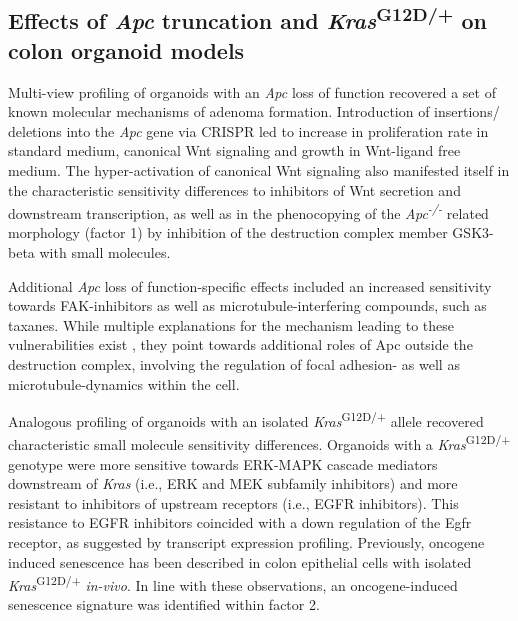 \begin{flushleft}
\clearpage
\subsection{Effects of \textit{Apc} truncation and \textit{Kras}\textsuperscript{G12D/+} on colon organoid models}

Multi-view profiling of organoids with an \textit{Apc} loss of function recovered a set of known molecular mechanisms of adenoma formation. Introduction of insertions/ deletions into the \textit{Apc} gene via CRISPR led to increase in proliferation rate in standard medium, canonical Wnt signaling and growth in Wnt-ligand free medium. The hyper-activation of canonical Wnt signaling also manifested itself in the characteristic sensitivity differences to inhibitors of Wnt secretion and downstream transcription, as well as in the phenocopying of the \textit{Apc\textsuperscript{-/-}} related morphology (factor 1) by inhibition of the destruction complex member GSK3-beta with small molecules.
\smallbreak

Additional \textit{Apc} loss of function-specific effects included an increased sensitivity towards FAK-inhibitors as well as microtubule-interfering compounds, such as taxanes. While multiple explanations for the mechanism leading to these vulnerabilities exist \parencite{ashtonFocalAdhesionKinase2010}, they point towards additional roles of Apc outside the destruction complex, involving the regulation of focal adhesion- \parencite{ashtonFocalAdhesionKinase2010, matsumotoBindingAPCDishevelled2010} as well as microtubule-dynamics \parencite{stolzWntMediatedProtein2015} within the cell.
\smallbreak

Analogous profiling of organoids with an isolated \textit{Kras}\textsuperscript{G12D/+} allele recovered characteristic small molecule sensitivity differences. Organoids with a \textit{Kras}\textsuperscript{G12D/+} genotype were more sensitive towards ERK-MAPK cascade mediators downstream of \textit{Kras} (i.e., ERK and MEK subfamily inhibitors) and more resistant to inhibitors of upstream receptors (i.e., EGFR inhibitors). This resistance to EGFR inhibitors coincided with a down regulation of the Egfr receptor, as suggested by transcript expression profiling. Previously, oncogene induced senescence has been described in colon epithelial cells with isolated \textit{Kras}\textsuperscript{G12D/+} \parencite{benneckeInk4aArfOncogeneinduced2010} \textit{in-vivo}. In line with these observations, an oncogene-induced senescence signature was identified within factor 2.
\smallbreak


\end{flushleft}
